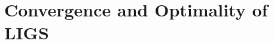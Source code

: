 \documentclass{article}
\begin{document}

\section{Convergence and Optimality of LIGS} \label{sec:convergence}
\end{document}
